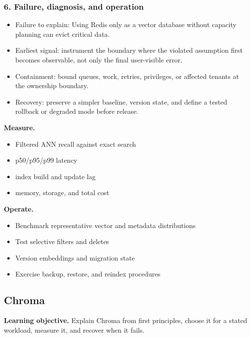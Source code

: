 \subsubsection*{6. Failure, diagnosis, and operation}
\begin{itemize}
\item Failure to explain: Using Redis only as a vector database without capacity planning can evict critical data.
\item Earliest signal: instrument the boundary where the violated assumption first becomes observable, not only the final user-visible error.
\item Containment: bound queues, work, retries, privileges, or affected tenants at the ownership boundary.
\item Recovery: preserve a simpler baseline, version state, and define a tested rollback or degraded mode before release.
\end{itemize}
\textbf{Measure.}\begin{itemize}
\item Filtered ANN recall against exact search
\item p50/p95/p99 latency
\item index build and update lag
\item memory, storage, and total cost
\end{itemize}
\textbf{Operate.}\begin{itemize}
\item Benchmark representative vector and metadata distributions
\item Test selective filters and deletes
\item Version embeddings and migration state
\item Exercise backup, restore, and reindex procedures
\end{itemize}
\subsection{Chroma}
\textbf{Learning objective.} Explain Chroma from first principles, choose it for a stated workload, measure it, and recover when it fails.
